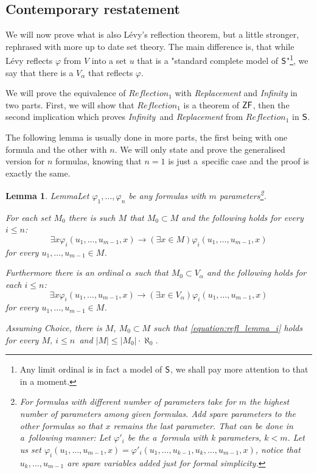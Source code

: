 \documentclass[12pt,a4paper]{article}
\newtheorem{lemma}[theorem]{Lemma}
\newcommand{\then}{\rightarrow}
\newcommand{\bce}{\begin{compactenum}}
\newcommand{\ece}{\end{compactenum}}
\begin{document}
\subsection{Contemporary restatement}
We will now prove what is also Lévy's reflection theorem, but a little stronger, rephrased with more up to date set theory. The main difference is, that while Lévy reflects $\varphi$ from $V$ into a set $u$ that is a "standard complete model of $\sf{S}$"\footnote{Any limit ordinal is in fact a model of $\sf{S}$, we shall pay more attention to that in a moment.}, we say that there is a $V_\alpha$ that reflects $\varphi$. 

We will prove the equivalence of \emph{$Reflection_1$} with \emph{Replacement} and \emph{Infinity} in two parts. First, we will show that \emph{$Reflection_1$} is a theorem of $\sf{ZF}$, then the second implication which proves \emph{Infinity} and \emph{Replacement} from \emph{$Reflection_1$} in $\sf{S}$.

The following lemma is usually done in more parts, the first being with one formula and the other with $n$. We will only state and prove the generalised version for $n$ formulas, knowing that $n=1$ is just a~specific case and the proof is exactly the same.

\begin{lemma}{Lemma}\label{lemma:reflection_lemma}
Let $\varphi_1, \ldots, \varphi_n$ be any formulas with $m$ parameters\footnote{For formulas with different number of parameters take for $m$ the highest number of parameters among given formulas. Add spare parameters to the other formulas so that $x$ remains the last parameter. That can be done in a~following manner: Let $\varphi'_i$ be the a~formula with k parameters, $k < m$. Let us set $\varphi_i(u_1, \ldots, u_{m-1}, x) = \varphi'_i(u_1, \ldots, u_{k-1}, u_k, \ldots, u_{m-1}, x)$, notice that $u_k, \ldots, u_{m-1}$ are spare variables added just for formal simplicity.}. 
\bce[(i)]
\item For each set $M_0$ there is such $M$ that $M_0 \subset M$ and the following holds for every $i \leq n$:
\begin{equation}\label{equation:refl_lemma_i}
\exists x \varphi_i(u_1, \ldots, u_{m-1}, x) \then (\exists x \in M) \varphi_i(u_1, \ldots, u_{m-1}, x)
\end{equation}
for every $u_1, \ldots, u_{m-1} \in M$.

\item Furthermore there is an ordinal $\alpha$ such that $M_0 \subset V_\alpha$ and the following holds for each $i \leq n$:
\begin{equation}
\exists x \varphi_i(u_1, \ldots, u_{m-1}, x) \then (\exists x \in V_\alpha) \varphi_i(u_1, \ldots, u_{m-1}, x)
\end{equation}
for every $u_1, \ldots, u_{m-1} \in M$.

\item Assuming \emph{Choice}, there is $M$, $M_0 \subset M$ such that \ref{equation:refl_lemma_i} holds for every $M,\ i \leq n$ and $|M| \leq |M_0| \cdot \aleph_0$.
\ece
\end{lemma}
\end{document}
